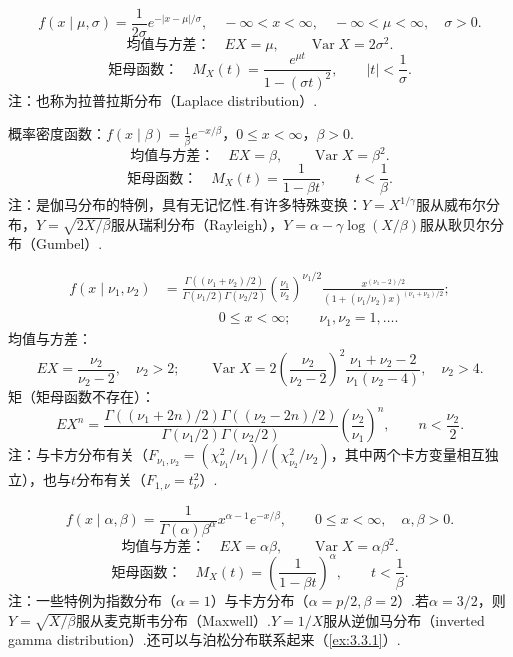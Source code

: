 $$f(x\mid\mu,\sigma)=\frac1{2\sigma}e^{-|x-\mu|/\sigma},\quad-\infty<x<\infty,\quad-\infty<\mu<\infty,\quad\sigma>0.$$
$$\text{均值与方差：}\quad EX=\mu,\qquad\operatorname{Var}X=2\sigma^2.$$
$$\text{矩母函数：}\quad M_X(t)=\frac{e^{\mu t}}{1-(\sigma t)^2},\qquad |t|<\frac1\sigma.$$
注：也称为拉普拉斯分布（Laplace distribution）.

概率密度函数：$f(x\mid\beta)=\frac1\beta e^{-x/\beta}$，$0\le x<\infty$，$\beta>0$.
$$\text{均值与方差：}\quad EX=\beta,\qquad\operatorname{Var}X=\beta^2.$$
$$\text{矩母函数：}\quad M_X(t)=\frac1{1-\beta t},\qquad t<\frac1\beta.$$
注：是伽马分布的特例，具有无记忆性.有许多特殊变换：$Y=X^{1/\gamma}$服从威布尔分布，$Y=\sqrt{2X/\beta}$服从瑞利分布（Rayleigh），$Y=\alpha-\gamma\log(X/\beta)$服从耿贝尔分布\mbox{（Gumbel）.}

\begin{equation*}\begin{aligned}
f(x\mid\nu_1,\nu_2)&=\frac{\Gamma((\nu_1+\nu_2)/2)}{\Gamma(\nu_1/2)\Gamma(\nu_2/2)}\left(\frac{\nu_1}{\nu_2}\right)^{\nu_1/2}\frac{x^{(\nu_1-2)/2}}{(1+(\nu_1/\nu_2)x)^{(\nu_1+\nu_2)/2}};\\
&\hspace{4em}0\le x<\infty;\qquad\nu_1,\nu_2=1,\ldots.
\end{aligned}\end{equation*}
均值与方差：
$$EX=\frac{\nu_2}{\nu_2-2},\quad\nu_2>2;\qquad\operatorname{Var}X=2\left(\frac{\nu_2}{\nu_2-2}\right)^2\frac{\nu_1+\nu_2-2}{\nu_1(\nu_2-4)},\quad\nu_2>4.$$
矩（矩母函数不存在）：
$$EX^n=\frac{\Gamma((\nu_1+2n)/2)\Gamma((\nu_2-2n)/2)}{\Gamma(\nu_1/2)\Gamma(\nu_2/2)}\left(\frac{\nu_2}{\nu_1}\right)^n,\qquad n<\frac{\nu_2}{2}.$$
注：与卡方分布有关（$F_{\nu_1,\nu_2}=(\chi_{\nu_1}^2/\nu_1)/(\chi_{\nu_2}^2/\nu_2)$，其中两个卡方变量相互独立），也与$t$分布有关（$F_{1,\nu}=t_\nu^2$）.

$$f(x\mid\alpha,\beta)=\frac1{\Gamma(\alpha)\beta^\alpha}x^{\alpha-1}e^{-x/\beta},\qquad0\le x<\infty,\quad\alpha,\beta>0.$$
$$\text{均值与方差：}\quad EX=\alpha\beta,\qquad\operatorname{Var}X=\alpha\beta^2.$$
$$\text{矩母函数：}\quad M_X(t)=\left(\frac1{1-\beta t}\right)^\alpha,\qquad t<\frac1\beta.$$
注：一些特例为指数分布（$\alpha=1$）与卡方分布（$\alpha=p/2,\beta=2$）.若$\alpha=3/2$，则$Y=\sqrt{X/\beta}$服从麦克斯韦分布（Maxwell）.$Y=1/X$服从逆伽马分布（inverted gamma distribution）.还可以与泊松分布联系起来（\autoref{ex:3.3.1}）.

